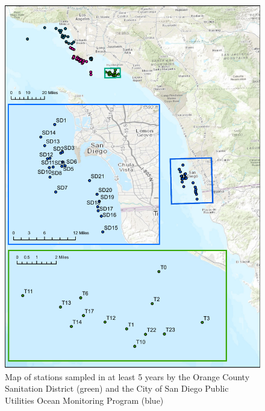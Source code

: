 \documentclass[12pt,]{article}
\begin{document}
\begin{figure}[htbp]
\centering
\includegraphics{Figures/Fleet7_sanitation_map1.pdf}
\caption{Map of stations sampled in at least 5 years by the Orange
County Sanitation District (green) and the City of San Diego Public
Utilities Ocean Monitoring Program (blue)
\label{fig:Fleet7_sanitation_map1}}
\end{figure}
\end{document}
